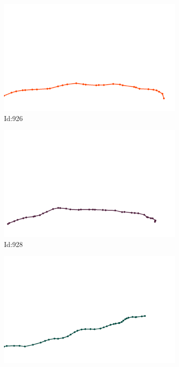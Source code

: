 \documentclass[12pt,twoside]{report}
\begin{document}
\begin{figure}
\begin{subfigure}[b]{0.20\textwidth}
\centering
\includegraphics[width=\textwidth]{../trajectories/926.png}
\caption{Id:926}
\end{subfigure}
\begin{subfigure}[b]{0.20\textwidth}
\centering
\includegraphics[width=\textwidth]{../trajectories/928.png}
\caption{Id:928}
\end{subfigure}
\begin{subfigure}[b]{0.20\textwidth}
\centering
\includegraphics[width=\textwidth]{../trajectories/937.png}

\end{subfigure}
\end{figure}
\end{document}
